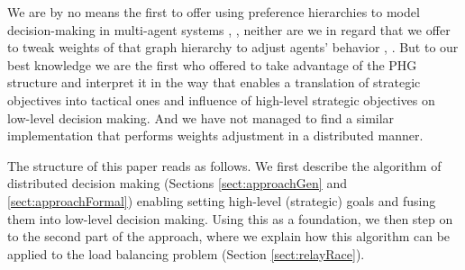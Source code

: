 We are by no means the first to offer using preference hierarchies to model decision-making in multi-agent systems \cite{cartvehishvili-2018-model}, \cite{drakaki-2018-intelligent}, neither are we in regard that we offer to tweak weights of that graph hierarchy to adjust agents' behavior \cite{zytniewski-2016-application}, \cite{brintrup-2010-behaviour}.
But to our best knowledge we are the first who offered to take advantage of the PHG structure and interpret it in the way that enables a translation of strategic objectives into tactical ones and influence of high-level strategic objectives on low-level decision making.
And we have not managed to find a similar implementation that performs weights adjustment in a distributed manner.

The structure of this paper reads as follows.
We first describe the algorithm of distributed decision making (Sections \ref{sect:approachGen} and \ref{sect:approachFormal}) enabling setting high-level (strategic) goals and fusing them into low-level decision making.
Using this as a foundation, we then step on to the second part of the approach, where we explain how this algorithm can be applied to the load balancing problem (Section \ref{sect:relayRace}).
